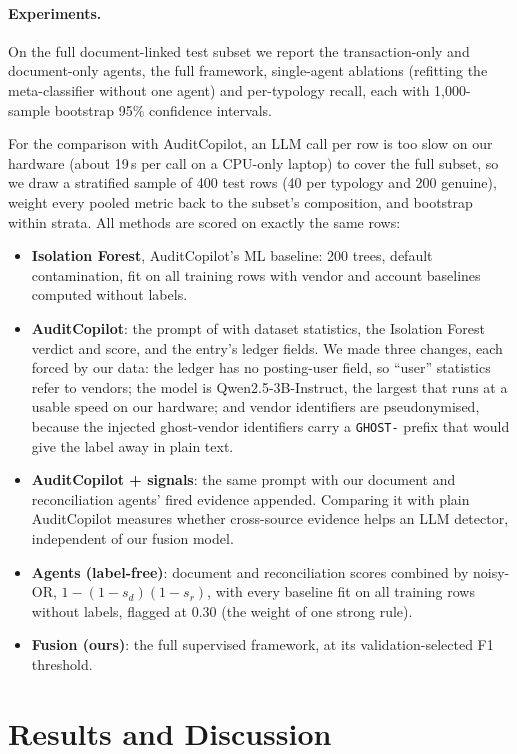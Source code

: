 \documentclass{article}
\begin{document}
\paragraph{Experiments.} On the full document-linked test subset we report the transaction-only and document-only agents, the full framework, single-agent ablations (refitting the meta-classifier without one agent) and per-typology recall, each with 1,000-sample bootstrap 95\% confidence intervals.

For the comparison with AuditCopilot, an LLM call per row is too slow on our hardware (about 19\,s per call on a CPU-only laptop) to cover the full subset, so we draw a stratified sample of 400 test rows (40 per typology and 200 genuine), weight every pooled metric back to the subset's composition, and bootstrap within strata. All methods are scored on exactly the same rows:
\begin{itemize}
  \item \textbf{Isolation Forest}, AuditCopilot's ML baseline: 200 trees, default contamination, fit on all training rows with vendor and account baselines computed without labels.
  \item \textbf{AuditCopilot}: the prompt of \citet[Fig.~1]{kadir2025auditcopilot} with dataset statistics, the Isolation Forest verdict and score, and the entry's ledger fields. We made three changes, each forced by our data: the ledger has no posting-user field, so ``user'' statistics refer to vendors; the model is Qwen2.5-3B-Instruct, the largest that runs at a usable speed on our hardware; and vendor identifiers are pseudonymised, because the injected ghost-vendor identifiers carry a \texttt{GHOST-} prefix that would give the label away in plain text.
  \item \textbf{AuditCopilot + signals}: the same prompt with our document and reconciliation agents' fired evidence appended. Comparing it with plain AuditCopilot measures whether cross-source evidence helps an LLM detector, independent of our fusion model.
  \item \textbf{Agents (label-free)}: document and reconciliation scores combined by noisy-OR, $1-(1-s_d)(1-s_r)$, with every baseline fit on all training rows without labels, flagged at 0.30 (the weight of one strong rule).
  \item \textbf{Fusion (ours)}: the full supervised framework, at its validation-selected F1 threshold.
\end{itemize}

\section{Results and Discussion}
\end{document}
